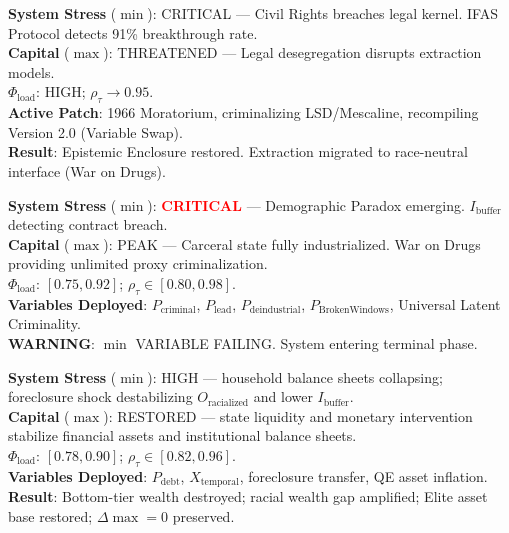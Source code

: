 \begin{tcolorbox}[colback=black!5, colframe=black!70, fonttitle=\bfseries\ttfamily, title=7. RUNTIME LOG: 1966 (SECURITY PATCH) \normalfont\small--- Chapter \ref{ch:recompile}]
\ttfamily\small
\textbf{System Stress} ($\min$): CRITICAL --- Civil Rights breaches legal kernel. IFAS Protocol detects 91\% breakthrough rate.\\
\textbf{Capital} ($\max$): THREATENED --- Legal desegregation disrupts extraction models.\\
\textbf{$\Phi_{\text{load}}$}: HIGH; $\rho_{\tau} \rightarrow 0.95$.\\
\textbf{Active Patch}: 1966 Moratorium, criminalizing LSD/Mescaline, recompiling Version 2.0 (Variable Swap).\\
\textbf{Result}: Epistemic Enclosure restored. Extraction migrated to race-neutral interface (War on Drugs).
\end{tcolorbox}

\begin{tcolorbox}[colback=black!5, colframe=black!70, fonttitle=\bfseries\ttfamily, title=8. RUNTIME LOG: 1968--1994 (THE RECOMPILE) \normalfont\small--- Chapter \ref{ch:recompile}]
\ttfamily\small
\textbf{System Stress} ($\min$): \textcolor{red}{\textbf{CRITICAL}} --- Demographic Paradox emerging. $I_{\text{buffer}}$ detecting contract breach.\\
\textbf{Capital} ($\max$): PEAK --- Carceral state fully industrialized. War on Drugs providing unlimited proxy criminalization.\\
\textbf{$\Phi_{\text{load}}$}: $[0.75, 0.92]$; $\rho_{\tau} \in [0.80, 0.98]$.\\
\textbf{Variables Deployed}: $P_{\text{criminal}}$, $P_{\text{lead}}$, $P_{\text{deindustrial}}$, $P_{\text{BrokenWindows}}$, Universal Latent Criminality.\\
\textbf{WARNING}: $\min$ VARIABLE FAILING. System entering terminal phase.
\end{tcolorbox}

\begin{tcolorbox}[colback=black!5, colframe=black!70, fonttitle=\bfseries\ttfamily, title=9. RUNTIME LOG: 2007--2012 (FINANCIAL RECOMPILE) \normalfont\small--- Chapter \ref{ch:full_algo}]
\ttfamily\small
\textbf{System Stress} ($\min$): HIGH --- household balance sheets collapsing; foreclosure shock destabilizing $O_{\text{racialized}}$ and lower $I_{\text{buffer}}$.\\
\textbf{Capital} ($\max$): RESTORED --- state liquidity and monetary intervention stabilize financial assets and institutional balance sheets.\\
\textbf{$\Phi_{\text{load}}$}: $[0.78, 0.90]$; $\rho_{\tau} \in [0.82, 0.96]$.\\
\textbf{Variables Deployed}: $P_{\text{debt}}$, $X_{\text{temporal}}$, foreclosure transfer, QE asset inflation.\\
\textbf{Result}: Bottom-tier wealth destroyed; racial wealth gap amplified; Elite asset base restored; $\Delta\max = 0$ preserved.
\end{tcolorbox}

